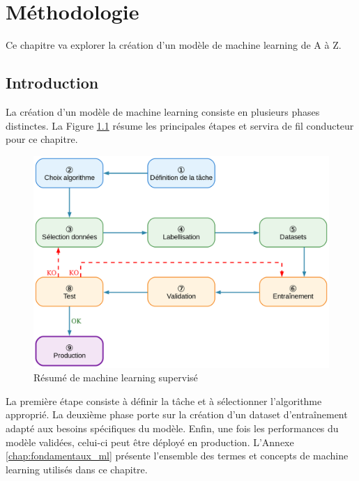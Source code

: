 \chapter{Méthodologie}
\label{chap:proposition_modele}

Ce chapitre va explorer la création d'un modèle de machine learning de A à Z.

\localtableofcontents

\newpage


\section{Introduction}
La création d'un modèle de machine learning consiste en plusieurs phases distinctes. La Figure \ref{fig:ch3_resume_machine_learning_supervise} résume les principales étapes et servira de fil conducteur pour ce chapitre.

\begin{figure}[H]
    \centering
    \includegraphics[width=1\linewidth]{03-tail/A1_fondamentaux_ML/A1_figures/A1_01_resume_machine_learning_supervise.png}
    \caption{Résumé de machine learning supervisé}
    \label{fig:ch3_resume_machine_learning_supervise}
\end{figure}

La première étape consiste à définir la tâche et à sélectionner l'algorithme approprié. La deuxième phase porte sur la création d'un dataset d'entraînement adapté aux besoins spécifiques du modèle. Enfin, une fois les performances du modèle validées, celui-ci peut être déployé en production. L'Annexe \ref{chap:fondamentaux_ml} présente l'ensemble des termes et concepts de machine learning utilisés dans ce chapitre.

